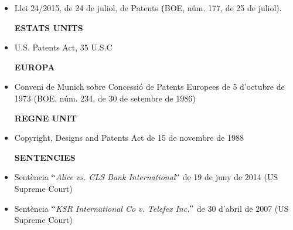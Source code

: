 \documentclass[12pt]{article}
\begin{document}
\vspace{\baselineskip}
\begin{itemize}
	\item Llei 24/2015, de 24 de juliol, de Patents\textbf{ (}BOE, núm. 177, de 25 de juliol).\par


\vspace{\baselineskip}
\textbf{ESTATS UNITS}\par


\vspace{\baselineskip}
	\item U.S. Patents Act, 35 U.S.C \par


\vspace{\baselineskip}
\textbf{EUROPA}\par


\vspace{\baselineskip}
	\item Conveni de Munich sobre Concessió de Patents Europees de 5 d’octubre de 1973 (BOE, núm. 234, de 30 de setembre de 1986)\par


\vspace{\baselineskip}
\textbf{REGNE UNIT}\par


\vspace{\baselineskip}
	\item Copyright, Designs and Patents Act de 15 de novembre de 1988\par


\vspace{\baselineskip}

\vspace{\baselineskip}

\vspace{\baselineskip}

\vspace{\baselineskip}
\begin{Center}
{\fontsize{16pt}{19.2pt}\selectfont \textbf{SENTENCIES}\par}
\end{Center}\par


\vspace{\baselineskip}

\vspace{\baselineskip}
	\item Sentència \textit{$``$Alice vs. CLS Bank International$"$  }de 19 de juny de 2014 (US Supreme Court)\par


\vspace{\baselineskip}
	\item Sentència\textit{ $``$KSR International Co v. Telefex Inc.$"$  }de 30 d’abril de 2007 (US Supreme Court)
\end{itemize}\par


\vspace{\baselineskip}

\printbibliography
\end{document}
